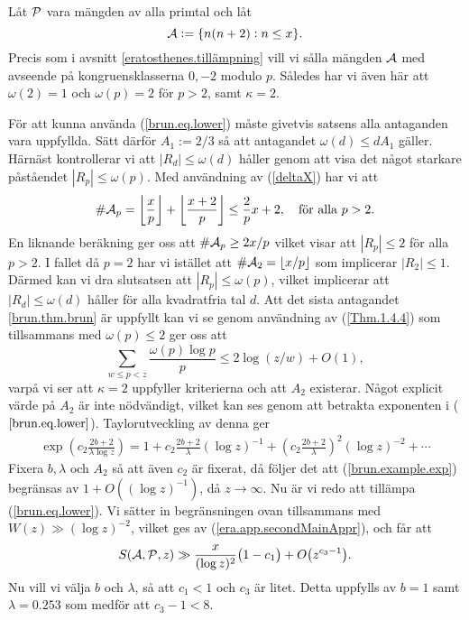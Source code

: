 Låt $\P$ vara mängden av alla primtal och låt
\begin{equation*}
    \A := \{n(n+2): n\leq x\}.
\end{equation*}
Precis som i avsnitt \ref{eratosthenes.tillämpning} vill vi sålla mängden $\A$ med avseende på kongruensklasserna $0,-2$ modulo $p$. Således har vi även här att $\omega(2)=1$ och $\omega(p)=2$ för $p>2$, samt $\kappa=2$.

För att kunna använda (\ref{brun.eq.lower}) måste givetvis satsens alla antaganden vara uppfyllda.
Sätt därför $A_1:=2/3$ så att antagandet $\omega(d)\leq dA_1$ gäller.
Härnäst kontrollerar vi att $|R_d|\leq \omega(d)$ håller genom att visa det något starkare påståendet $|R_p|\leq \omega(p)$. Med användning av (\ref{deltaX}) har vi att 
\begin{equation*}
    \card \A_p = \left\lfloor \frac{x}{p} \right\rfloor + \left\lfloor \frac{x+2}{p} \right\rfloor 
    \leq \frac{2}{p}x +2,\quad\text{för alla $p>2$}.
\end{equation*}
En liknande beräkning ger oss att $\card \A_p\geq 2x/p$ vilket visar att $|R_p|\leq 2$ för alla $p>2$.
I fallet då $p=2$ har vi istället att $\card\A_2=\lfloor x/p \rfloor$ som implicerar $|R_2|\leq 1$. Därmed kan vi dra slutsatsen att $|R_p|\leq \omega(p)$, vilket implicerar att $|R_d|\leq \omega(d)$ håller för alla kvadratfria tal $d$. 
Att det sista antagandet \ref{brun.thm.brun} är uppfyllt kan vi se genom användning av (\ref{Thm.1.4.4}) som tillsammans med $\omega(p)\leq2$ ger oss att
\begin{equation*}
    \sum_{w\leq p<z} \frac{\omega(p)\log p}{p} \leq 2\log\left(z/w\right) + O(1),
\end{equation*}
varpå vi ser att $\kappa=2$ uppfyller kriterierna och att $A_2$ existerar.
Något explicit värde på $A_2$ är inte nödvändigt, vilket kan ses genom att betrakta exponenten i ($\ref{brun.eq.lower}$). Taylorutveckling av denna ger
\begin{align}\label{brun.example.exp}
    \exp\left(c_2\frac{2b+2}{\lambda\log z}\right) = 1 + c_2\frac{2b+2}{\lambda}(\log z)^{-1} + \left(c_2\frac{2b+2}{\lambda}\right)^2(\log z)^{-2} + \cdots
\end{align}
Fixera $b,\lambda$ och $A_2$ så att även $c_2$ är fixerat, då följer det att (\ref{brun.example.exp}) begränsas av $1+O((\log z)^{-1})$, då $z\to\infty$.
Nu är vi redo att tillämpa (\ref{brun.eq.lower}). 
Vi sätter in begränsningen ovan tillsammans med $W(z) \gg (\log z)^{-2}$, vilket ges av (\ref{era.app.secondMainAppr}), och får att
\begin{equation} \label{brun.example.sap}
    \S{A}{P}{z} \gg \frac{x}{(\log z)^2}\bigl(1 - c_1\bigr) + O\bigl(z^{c_3 - 1}\bigr).
\end{equation}
Nu vill vi välja $b$ och $\lambda$, så att $c_1<1$ och $c_3$ är litet. 
Detta uppfylls av $b=1$ samt $\lambda=0.253$ som medför att $c_3-1<8$.

